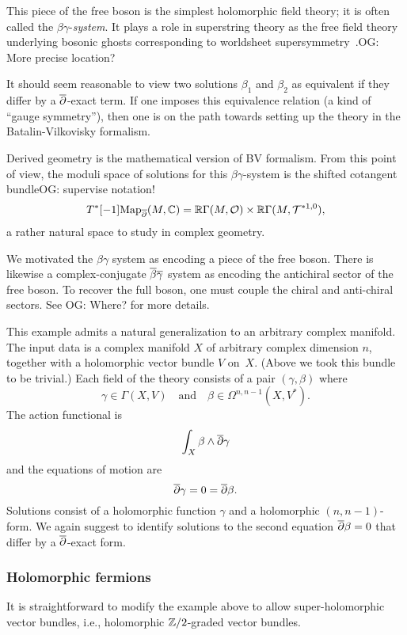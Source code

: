 \documentclass[11pt]{amsart}
\def\owen#1{{\textcolor{violet!50!black}{OG: {#1}}}}
\begin{document}
This piece of the free boson is the simplest holomorphic field theory; it is often called the $\beta\gamma$-\textit{system}.
It plays a role in superstring theory as the free field theory underlying bosonic ghosts corresponding to worldsheet supersymmetry~\cite{Polchinski}.\owen{More precise location?}

It should seem reasonable to view two solutions $\beta_1$ and $\beta_2$ as equivalent if they differ by a $\dbar$-exact term.
If one imposes this equivalence relation (a kind of ``gauge symmetry''),
then one is on the path towards setting up the theory in the Batalin-Vilkovisky formalism.

Derived geometry is the mathematical version of BV formalism.
From this point of view, the moduli space of solutions for this $\beta\gamma$-system is the shifted cotangent bundle\owen{supervise notation!}
\[
T^*[-1] \Map_\dbar(M,\CC) = \RR\Gamma(M,\cO) \times \RR\Gamma(M,\cT^{*{1,0}}),
\]
a rather natural space to study in complex geometry.

\begin{rmk}
We motivated the $\beta\gamma$ system as encoding a piece of the free boson.
There is likewise a complex-conjugate $\Bar{\beta}\Bar{\gamma}$ system as encoding the antichiral sector of the free boson.
To recover the full boson, one must couple the chiral and anti-chiral sectors.
See \cite{Kapustin,GGW} \owen{Where?} for more details. 
\end{rmk}

This example admits a natural generalization to an arbitrary complex manifold.
The input data is a complex manifold $X$ of arbitrary complex dimension $n$, 
together with a holomorphic vector bundle $V$ on~$X$.
(Above we took this bundle to be trivial.)
Each field of the theory consists of a pair $(\gamma,\beta)$ where 
\[
\gamma \in \Gamma(X,V) \quad\text{and}\quad \beta \in \Omega^{n,n-1}(X,V^*) .
\]
The action functional is 
\[
\int_X \beta \wedge \dbar \gamma
\]
and the equations of motion are
\[
\dbar \gamma = 0 = \dbar \beta.
\]
Solutions consist of a holomorphic function $\gamma$ and a holomorphic $(n,n-1)$-form.
We again suggest to identify solutions to the second equation $\dbar \beta = 0$ that differ by a $\dbar$-exact form.

\subsubsection{Holomorphic fermions}

It is straightforward to modify the example above to allow super-holomorphic vector bundles,
i.e., holomorphic $\ZZ/2$-graded vector bundles.
\end{document}
